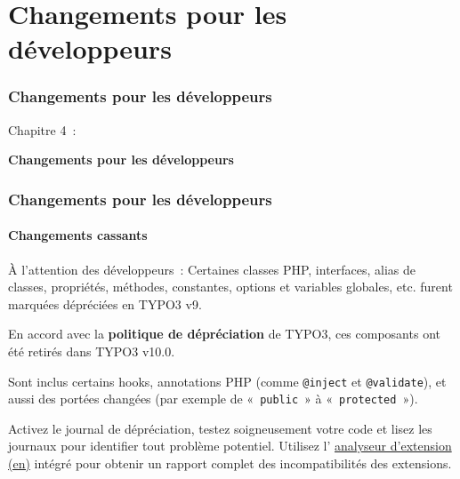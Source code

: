 %

\section{Changements pour les développeurs}
\begin{frame}[fragile]
	\frametitle{Changements pour les développeurs}

	\begin{center}\huge{Chapitre 4~:}\end{center}
	\begin{center}\huge{\color{typo3darkgrey}\textbf{Changements pour les développeurs}}\end{center}

\end{frame}


\begin{frame}[fragile]
	\frametitle{Changements pour les développeurs}
	\framesubtitle{Changements cassants}

	\small
		À l'attention des développeurs~: Certaines classes PHP, interfaces, alias de classes,
		propriétés, méthodes, constantes, options et variables globales, etc. furent marquées
		dépréciées en TYPO3 v9.

		\vspace{0.2cm}

		En accord avec la \textbf{politique de dépréciation} de TYPO3, ces composants ont été
		retirés dans TYPO3 v10.0.

		\vspace{0.2cm}

		Sont inclus certains hooks, annotations PHP (comme \texttt{@inject} et
		\texttt{@validate}), et aussi des portées changées (par exemple de
		«~\texttt{public}~» à «~\texttt{protected}~»).

		\vspace{0.2cm}

		Activez le journal de dépréciation, testez soigneusement votre code et lisez
		les journaux pour identifier tout problème potentiel. Utilisez l'
		\href{https://docs.typo3.org/m/typo3/reference-coreapi/master/en-us/ApiOverview/ExtensionScanner/Index.html}{analyseur d'extension (en)}
		intégré pour obtenir un rapport complet des incompatibilités des extensions.

	\normalsize

\end{frame}

